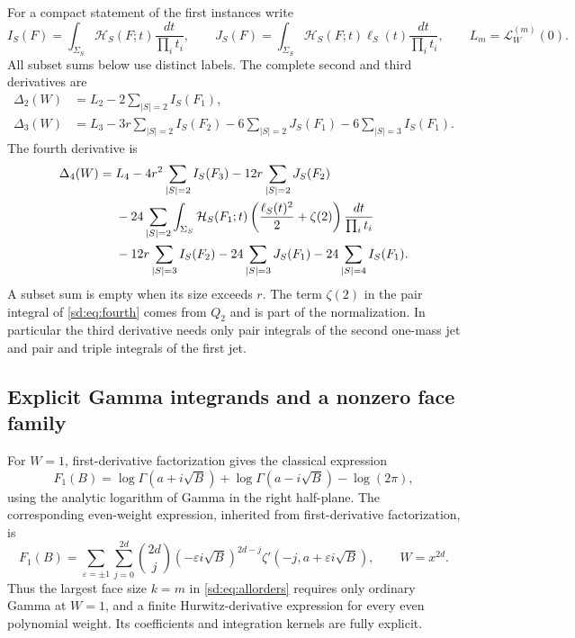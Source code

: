 For a compact statement of the first instances write
\[
 I_S(F)=\int_{\Sigma_S}\mathcal H_S(F;t)
                       \frac{dt}{\prod_i t_i},\qquad
 J_S(F)=\int_{\Sigma_S}\mathcal H_S(F;t)\ell_S(t)
                       \frac{dt}{\prod_i t_i},
 \qquad L_m=\mathcal L_W^{(m)}(0).
\]
All subset sums below use distinct labels.  The complete second and
third derivatives are
\begin{align}
 \Delta_2(W)&=L_2-2\sum_{|S|=2}I_S(F_1),
                    \label{sd:eq:second}\\
 \Delta_3(W)&=L_3-3r\sum_{|S|=2}I_S(F_2)
                  -6\sum_{|S|=2}J_S(F_1)
                  -6\sum_{|S|=3}I_S(F_1).
                    \label{sd:eq:third}
\end{align}
The fourth derivative is
\begin{align}\label{sd:eq:fourth}
 \Delta_4(W)={}&L_4-4r^2\sum_{|S|=2}I_S(F_3)
                    -12r\sum_{|S|=2}J_S(F_2)\notag\\
 &-24\sum_{|S|=2}\int_{\Sigma_S}\mathcal H_S(F_1;t)
             \left(\frac{\ell_S(t)^2}{2}+\zeta(2)\right)
                                  \frac{dt}{\prod_i t_i}\notag\\
 &-12r\sum_{|S|=3}I_S(F_2)-24\sum_{|S|=3}J_S(F_1)
                              -24\sum_{|S|=4}I_S(F_1).
\end{align}
A subset sum is empty when its size exceeds $r$.  The term $\zeta(2)$
in the pair integral of \eqref{sd:eq:fourth} comes from $Q_2$ and is
part of the normalization.  In particular the third derivative needs
only pair integrals of the second one-mass jet and pair and triple
integrals of the first jet.

\subsection{Explicit Gamma integrands and a nonzero face family}
\label{sd:subsec:gamma}

For $W=1$, first-derivative factorization gives the classical expression
\begin{equation}\label{sd:eq:gamma}
 F_1(B)=\log\Gamma(a+i\sqrt B)+\log\Gamma(a-i\sqrt B)
                                      -\log(2\pi),
\end{equation}
using the analytic logarithm of Gamma in the right half-plane.
The corresponding even-weight expression, inherited from
first-derivative factorization, is
\begin{equation}\label{sd:eq:evenhurwitz}
 F_1(B)=\sum_{\varepsilon=\pm1}\sum_{j=0}^{2d}
   \binom{2d}{j}(-\varepsilon i\sqrt B)^{2d-j}
               \zeta'(-j,a+\varepsilon i\sqrt B),
             \qquad W=x^{2d}.
\end{equation}
Thus the largest face size $k=m$ in \eqref{sd:eq:allorders} requires
only ordinary Gamma at $W=1$, and a finite Hurwitz-derivative expression
for every even polynomial weight.  Its coefficients and integration
kernels are fully explicit.

